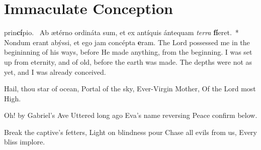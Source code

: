{
\def\gabcfolder{../December8-ImmaculateConception}
\section{Immaculate Conception}
\subtitle{1st Class, December 8}

\deusinadjutorium{}

\bigskip
{}
{\def\anttranslation{Thou art all fair, O Mary; and the original stain is not in thee.}
\def\dontrepeatantiphon{T}
}
\bigskip
{}
{\def\anttranslation{Thy vesture is white as snow; and thy face is as the sun.}
}
\bigskip
{}
{\def\anttranslation{Thou art the glory of Jerusalem; thou art the joy of Israel; thou art the honour of our people.}
}
\bigskip
{
\def\anttranslation{Blessed art thou, O Virgin Mary, by the Lord, the Most High God, above all women upon the earth.}
\def\dontrepeatantiphon{T}
\def\noeuouae{T}
}
\bigskip
{
\def\anttranslation{Draw us, O immaculate Virgin: we will run after thee in the odour of thine ointments.}
}
{}
\printchapter
{ prin\-\textbf{cí}\-pi\-o.~\dag{} Ab ætérno ordináta sum, et ex antíquis ántequam \emph{ter\-ra} \textbf{fí}\-e\-ret.~* Nondum erant abýssi, et ego jam concépta \textbf{e}\-ram.}
{The Lord possessed me in the begininning of his ways, before He made anything, from the beginning.  I was set up from eternity, and of old, before the earth was made.  The depths were not as yet, and I was already conceived.}

\bigskip
\label{hymn-avemarisstella}
{
\item Hail, thou star of ocean,
Portal of the sky,
Ever-Virgin Mother,
Of the Lord most High.

\item Oh! by Gabriel's Ave
Uttered long ago
Eva's name reversing
Peace confirm below.

\item Break the captive's fetters,
Light on blindness pour
Chase all evils from us,
Every bliss implore.

}}
